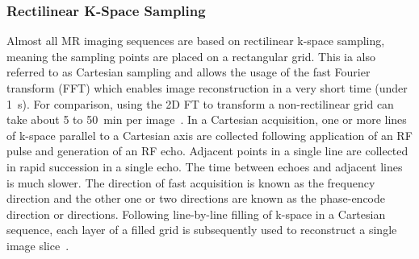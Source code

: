 \subsubsection{Rectilinear K-Space Sampling}
Almost all MR imaging sequences 
are based on rectilinear k-space sampling, meaning the sampling points 
are placed on a rectangular grid. This 
ia also referred to as Cartesian sampling and 
allows the usage of the fast Fourier transform (FFT) 
which enables 
image reconstruction in 
a very short time (under 1~s). 
For comparison, using
the 
2D FT 
to transform a non-rectilinear grid can take about
5 to 50~min per image~\cite{SamplingStrategies}.
In a Cartesian acquisition, one or more lines of k-space parallel to a Cartesian axis are collected following application of an RF pulse and generation of an RF echo. Adjacent points in a single line are collected in rapid succession in a single echo. The time between echoes and adjacent lines is much slower. The direction of fast acquisition is known as the frequency direction and the other one or two directions are known as the phase-encode direction or directions. Following line-by-line filling of k-space in a Cartesian sequence, each layer of a filled grid is subsequently used to reconstruct a single image slice~\cite{Bardo2021}.


